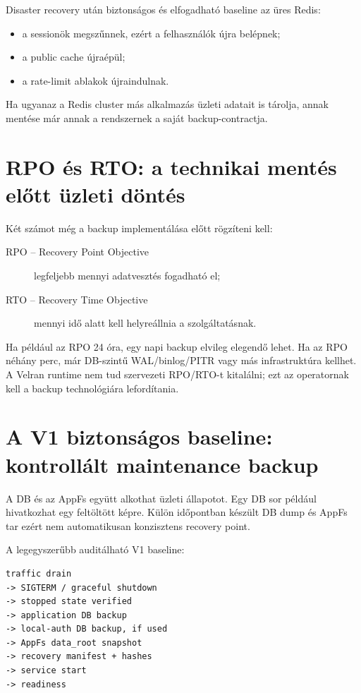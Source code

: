 Disaster recovery után biztonságos és elfogadható baseline az üres Redis:

\begin{itemize}
  \item a sessionök megszűnnek, ezért a felhasználók újra belépnek;
  \item a public cache újraépül;
  \item a rate-limit ablakok újraindulnak.
\end{itemize}

Ha ugyanaz a Redis cluster más alkalmazás üzleti adatait is tárolja, annak mentése már annak a rendszernek a saját backup-contractja.

\section{RPO és RTO: a technikai mentés előtt üzleti döntés}

Két számot még a backup implementálása előtt rögzíteni kell:

\begin{description}
  \item[RPO -- Recovery Point Objective] legfeljebb mennyi adatvesztés fogadható el;
  \item[RTO -- Recovery Time Objective] mennyi idő alatt kell helyreállnia a szolgáltatásnak.
\end{description}

Ha például az RPO 24 óra, egy napi backup elvileg elegendő lehet. Ha az RPO néhány perc, már DB-szintű WAL/binlog/PITR vagy más infrastruktúra kellhet. A Velran runtime nem tud szervezeti RPO/RTO-t kitalálni; ezt az operatornak kell a backup technológiára lefordítania.

\section{A V1 biztonságos baseline: kontrollált maintenance backup}

A DB és az AppFs együtt alkothat üzleti állapotot. Egy DB sor például hivatkozhat egy feltöltött képre. Külön időpontban készült DB dump és AppFs tar ezért nem automatikusan konzisztens recovery point.

A legegyszerűbb auditálható V1 baseline:

\begin{lstlisting}
traffic drain
-> SIGTERM / graceful shutdown
-> stopped state verified
-> application DB backup
-> local-auth DB backup, if used
-> AppFs data_root snapshot
-> recovery manifest + hashes
-> service start
-> readiness
\end{lstlisting}

